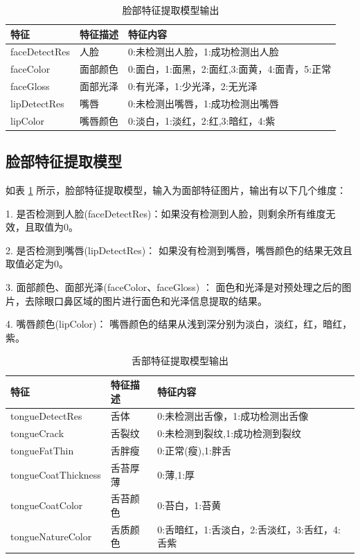 \begin{table}[]
    \centering
    \begin{tabular}{lll}
        \toprule
        特征          & 特征描述     & 特征内容 \\ 
        \midrule
        faceDetectRes & 人脸   & 0:未检测出人脸，1:成功检测出人脸  \\
        faceColor     & 面部颜色 & 0:面白，1:面黑，2:面红,3:面黄，4:面青，5:正常 \\
        faceGloss     & 面部光泽 & 0:有光泽，1:少光泽，2:无光泽\\
        lipDetectRes  & 嘴唇   & 0:未检测出嘴唇，1:成功检测出嘴唇\\
        lipColor      & 嘴唇颜色 & 0:淡白，1:淡红，2:红,3:暗红，4:紫   \\
        \bottomrule
    \end{tabular}
    \caption{脸部特征提取模型输出}
    \label{tab:face-feature}
\end{table}

\subsection{脸部特征提取模型}
如表 \ref{tab:face-feature} 所示，脸部特征提取模型，输入为面部特征图片，输出有以下几个维度：

1. 是否检测到人脸(faceDetectRes)：如果没有检测到人脸，则剩余所有维度无效，且取值为0。

2. 是否检测到嘴唇(lipDetectRes)： 如果没有检测到嘴唇，嘴唇颜色的结果无效且取值必定为0。

3. 面部颜色、面部光泽(faceColor、faceGloss) ： 面色和光泽是对预处理之后的图片，去除眼口鼻区域的图片进行面色和光泽信息提取的结果。

4. 嘴唇颜色(lipColor)： 嘴唇颜色的结果从浅到深分别为淡白，淡红，红，暗红，紫。

\begin{table}[]
    \centering
    \begin{tabular}{lll}
        \toprule
        特征 & 特征描述 & 特征内容 \\ 
        \midrule
        tongueDetectRes & 舌体 & 0:未检测出舌像，1:成功检测出舌像 \\
        tongueCrack & 舌裂纹 & 0:未检测到裂纹,1:成功检测到裂纹 \\ 
        tongueFatThin & 舌胖瘦 & 0:正常(瘦),1:胖舌 \\
        tongueCoatThickness & 舌苔厚薄 & 0:薄,1:厚 \\
        tongueCoatColor & 舌苔颜色 & 0:苔白，1:苔黄 \\
        tongueNatureColor & 舌质颜色 & 0:舌暗红，1:舌淡白，2:舌淡红，3:舌红，4:舌紫\\
        \bottomrule
    \end{tabular}

    \caption{舌部特征提取模型输出}
    \label{tab:tongue-feature}
\end{table}

